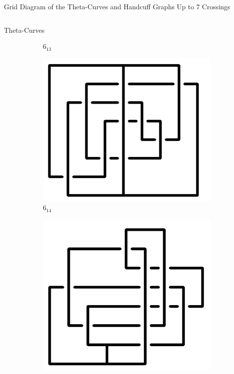\documentclass[final]{beamer}
\begin{document}
\begin{frame}[t]
\begin{alertblock}{Grid Diagram of the Theta-Curves and Handcuff Graphs Up to 7 Crossings}
\begin{columns}[t]
\begin{column}{0.5\textwidth}
\begin{alertblock}{Theta-Curves}
\begin{figure}
\begin{subfigure}{0.075\textwidth}
    \caption{$6_{13}$} 
    \end{subfigure}
    \begin{subfigure}{0.075\textwidth}
    \includegraphics[width=\columnwidth]{../Midterm_Poster/grid_diagram/theta_6_14.png}
    \caption{$6_{14}$} 
    \end{subfigure}
    \begin{subfigure}{0.075\textwidth}
    \includegraphics[width=\columnwidth]{../Midterm_Poster/grid_diagram/theta_6_15.png}

\end{subfigure}
\end{figure}
\end{alertblock}
\end{column}
\end{columns}
\end{alertblock}
\end{frame}
\end{document}
